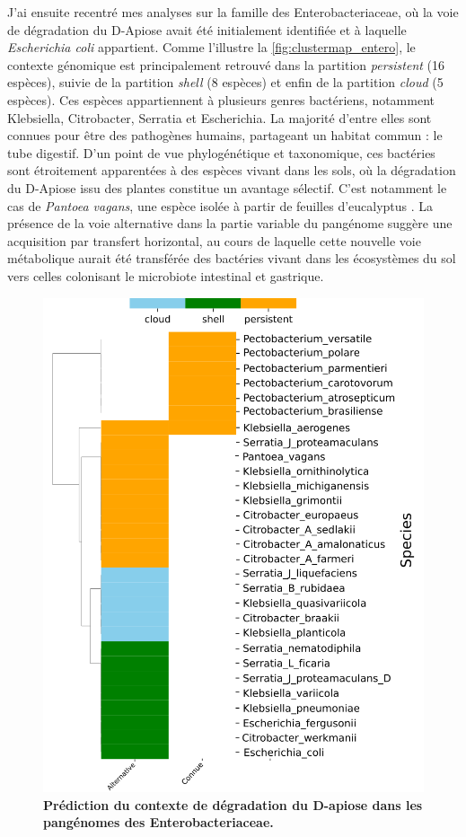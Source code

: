 J'ai ensuite recentré mes analyses sur la famille des Enterobacteriaceae, où la voie de dégradation du D-Apiose avait été initialement identifiée \cite{carter_functional_2018} et à laquelle \textit{Escherichia coli} appartient.
Comme l'illustre la \autoref{fig:clustermap_entero}, le contexte génomique est principalement retrouvé dans la partition \textit{persistent} (16 espèces), suivie de la partition \textit{shell} (8 espèces) et enfin de la partition \textit{cloud} (5 espèces). 
Ces espèces appartiennent à plusieurs genres bactériens, notamment Klebsiella, Citrobacter, Serratia et Escherichia. La majorité d’entre elles sont connues pour être des pathogènes humains, partageant un habitat commun : le tube digestif. D’un point de vue phylogénétique et taxonomique, ces bactéries sont étroitement apparentées à des espèces vivant dans les sols, où la dégradation du D-Apiose issu des plantes constitue un avantage sélectif. C’est notamment le cas de \textit{Pantoea vagans}, une espèce isolée à partir de feuilles d’eucalyptus \cite{brady_pantoea_2009}.
La présence de la voie alternative dans la partie variable du pangénome suggère une acquisition par transfert horizontal, au cours de laquelle cette nouvelle voie métabolique aurait été transférée des bactéries vivant dans les écosystèmes du sol vers celles colonisant le microbiote intestinal et gastrique.

\begin{figure}[htbp] 
    \centering
    \includegraphics[width=.9\textwidth]{images/clustermap3.png}
    \caption[Prédiction du contexte de dégradation du D-apiose dans les pangénomes des Enterobacteriaceae]{\textbf{Prédiction du contexte de dégradation du D-apiose dans les pangénomes des Enterobacteriaceae.}} 
    \label{fig:clustermap_entero}
\end{figure}

